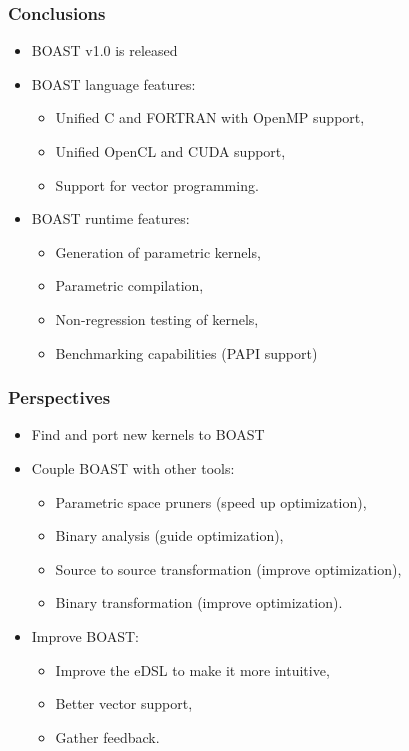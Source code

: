 \documentclass{beamer}
\begin{document}
\begin{frame}
  \frametitle{Conclusions}
  \begin{itemize}
    \item BOAST v1.0 is released
    \item BOAST language features:
    \begin{itemize}
      \item Unified C and FORTRAN with OpenMP support,
      \item Unified OpenCL and CUDA support,
      \item Support for vector programming.
    \end{itemize}
    \item BOAST runtime features:
    \begin{itemize}
      \item Generation of parametric kernels,
      \item Parametric compilation,
      \item Non-regression testing of kernels,
      \item Benchmarking capabilities (PAPI support)
    \end{itemize}
  \end{itemize}
\end{frame}

\begin{frame}
  \frametitle{Perspectives}
  \begin{itemize}
    \item Find and port new kernels to BOAST
    \item Couple BOAST with other tools:
    \begin{itemize}
      \item Parametric space pruners (speed up optimization),
      \item Binary analysis (guide optimization),
      \item Source to source transformation (improve optimization),
      \item Binary transformation (improve optimization).
    \end{itemize}
    \item Improve BOAST:
    \begin{itemize}
      \item Improve the eDSL to make it more intuitive,
      \item Better vector support,
      \item Gather feedback.
    \end{itemize}
  \end{itemize}
\end{frame}
\end{document}
